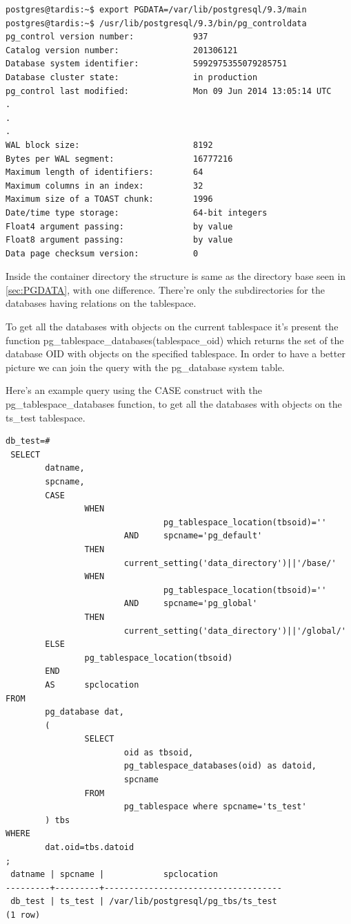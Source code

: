 \begin{verbatim}
postgres@tardis:~$ export PGDATA=/var/lib/postgresql/9.3/main
postgres@tardis:~$ /usr/lib/postgresql/9.3/bin/pg_controldata 
pg_control version number:            937
Catalog version number:               201306121
Database system identifier:           5992975355079285751
Database cluster state:               in production
pg_control last modified:             Mon 09 Jun 2014 13:05:14 UTC
.
.
.
WAL block size:                       8192
Bytes per WAL segment:                16777216
Maximum length of identifiers:        64
Maximum columns in an index:          32
Maximum size of a TOAST chunk:        1996
Date/time type storage:               64-bit integers
Float4 argument passing:              by value
Float8 argument passing:              by value
Data page checksum version:           0

\end{verbatim}

Inside the container directory the structure is same as the directory base seen in 
\ref{sec:PGDATA}, 
with one difference. There're only the subdirectories for the databases having relations on the 
tablespace.\newline

To get all the databases with objects on the current tablespace it's present the function 
pg\_tablespace\_databases(tablespace\_oid) which returns the set of the database OID with objects 
on 
the specified tablespace. In order to have a better picture we can join the query with the 
pg\_database system table.\newline

Here's an example query using the CASE construct with the pg\_tablespace\_databases function, to 
get 
all the databases with objects on the ts\_test tablespace.\newpage
\begin{lstlisting}[style=pgsql]
 db_test=# 
 SELECT
        datname,
        spcname,
        CASE
                WHEN 
                                pg_tablespace_location(tbsoid)=''
                        AND     spcname='pg_default'
                THEN
                        current_setting('data_directory')||'/base/'
                WHEN 
                                pg_tablespace_location(tbsoid)=''
                        AND     spcname='pg_global'
                THEN
                        current_setting('data_directory')||'/global/'
        ELSE
                pg_tablespace_location(tbsoid)
        END
        AS      spclocation
FROM
        pg_database dat,
        (
                SELECT
                        oid as tbsoid,
                        pg_tablespace_databases(oid) as datoid,
                        spcname 
                FROM 
                        pg_tablespace where spcname='ts_test'
        ) tbs
WHERE
        dat.oid=tbs.datoid
;
 datname | spcname |            spclocation             
---------+---------+------------------------------------
 db_test | ts_test | /var/lib/postgresql/pg_tbs/ts_test
(1 row)

\end{lstlisting}

